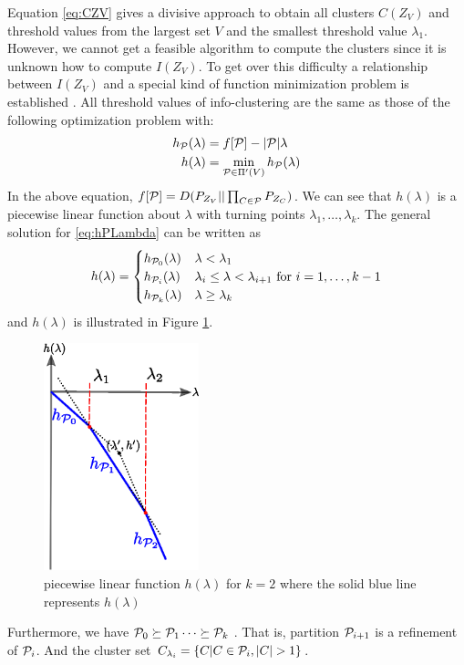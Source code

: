 Equation \eqref{eq:CZV} gives a divisive approach to obtain all clusters $C(Z_V)$ and threshold values from
the largest set $V$ and the smallest threshold value $\lambda_1$. However, we cannot get a feasible algorithm
to compute the clusters since it is unknown how to compute $I(Z_V)$.
To get over this difficulty a relationship between $I(Z_V)$ and
a special kind of function minimization problem is established \citep{mac}. All threshold values of info-clustering are the same as those of
the following optimization problem with:
\begin{align}\label{eq:hPLambda}
h_{\mathcal{P}}(\lambda) &= f[\mathcal{P}] - |\mathcal{P}| \lambda \notag\\
h(\lambda) &= \min_{\mathcal{P} \in \Pi'(V)}h_{\mathcal{P}}(\lambda)
\end{align}
In the above equation, $f[\mathcal{P}]=D(P_{Z_V} || \prod_{C\in \P}P_{Z_C})$. We can see that $h(\lambda)$ is a piecewise linear function about $\lambda$ with turning points
$\lambda_1, \dots, \lambda_{k}$. The general solution for \eqref{eq:hPLambda} can be written as
\begin{equation}\label{eq:PSP_structure}
h(\lambda) = \begin{cases} h_{\P_0}(\lambda) & \lambda < \lambda_1 \\
h_{\P_i}(\lambda) & \lambda_i \leq \lambda < \lambda_{i+1} \textrm{ for } i = 1, \dots, k-1 \\
h_{\P_k}(\lambda) & \lambda \geq \lambda_k
\end{cases}
\end{equation}
and $h(\lambda)$ is illustrated in Figure \ref{fig:psp}.
\begin{figure}
	\centering
	\includegraphics[width=0.4\textwidth]{psp.eps}
	\caption{piecewise linear function $h(\lambda)$ for $k=2$ where the solid blue line represents $h(\lambda)$ }\label{fig:psp}
\end{figure}
Furthermore, we have $\P_0 \succeq \P_1 \dots \succeq \P_k$ \citep{narayanan}. That is, partition $\P_{i+1}$ is a refinement of $\P_i$.
And the cluster set $C_{\lambda_i} =\{C | C\in \P_i, \abs{C} > 1\}$.

